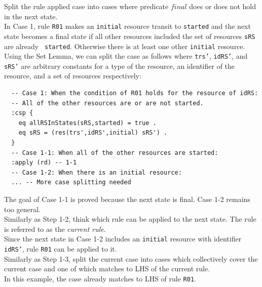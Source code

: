 \documentclass[12pt]{report}
\begin{document}
 Split the rule applied case into cases where
predicate $final$ does or does not hold in the next state.\\ 
In Case 1, rule {\tt R01} makes an {\tt initial} resource transit to
{\tt started} and the next state becomes a final state if all other
resources included the set of resources {\tt sRS} are already {\tt
  started}. Otherwise there is at least one other {\tt initial}
resource.  Using the Set Lemma, we can split the case as follows where
{\tt trs'}, {\tt idRS'}, and {\tt sRS'} are arbitrary constants for a
type of the resource, an identifier of the resource, and a set of
resources respectively:
\small
\begin{verbatim}
  -- Case 1: When the condition of R01 holds for the resource of idRS:
  -- All of the other resources are or are not started.
  :csp {
    eq allRSInStates(sRS,started) = true .
    eq sRS = (res(trs',idRS',initial) sRS') .
  }
  -- Case 1-1: When all of the other resources are started:
  :apply (rd) -- 1-1
  -- Case 1-2: When there is an initial resource:
  ... -- More case splitting needed
\end{verbatim}
\normalsize
The goal of Case 1-1 is proved because the next state is final.  Case
1-2 remains too general.\\

 Similarly as Step 1-2, think which rule can
be applied to the next state. The rule is referred to as the {\it current
rule}.\\
Since the next state in Case 1-2 includes an {\tt initial} resource
with identifier {\tt idRS'}, rule {\tt R01} can be applied to it.\\

 Similarly as Step 1-3, split the current case
into cases which collectively cover the current case and one of which
matches to LHS of the current rule. \\ 
In this example, the case already matches to LHS of rule {\tt R01}.\\
\end{document}
